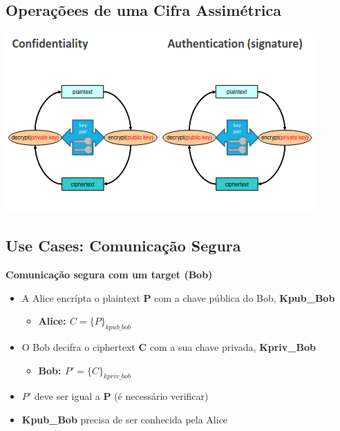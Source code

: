 \documentclass{article}
\begin{document}
\subsection{Operaçõees de uma Cifra Assimétrica}

\begin{center}
  \includegraphics[scale=0.6]{1}
\end{center}

\subsection{Use Cases: Comunicação Segura}

\begin{flushleft}
  \textbf{Comunicação segura com um target (Bob)}
  \begin{itemize}
    \item A Alice encrípta o plaintext \textbf{P} com a chave pública do Bob, \textbf{Kpub\_Bob}
    \begin{itemize}
      \item \textbf{Alice: $C = \{P\}_{kpub\_bob}$}
    \end{itemize}
    \item O Bob decifra o ciphertext \textbf{C} com a sua chave privada, \textbf{Kpriv\_Bob}
    \begin{itemize}
      \item \textbf{Bob: $P' = \{C\}_{kpriv\_bob}$}
    \end{itemize}
    \item $P'$ deve ser igual a \textbf{P} (é necessário verificar)
    \item \textbf{Kpub\_Bob} precisa de ser conhecida pela Alice
  \end{itemize}
\end{flushleft}

\pagebreak
\end{document}
